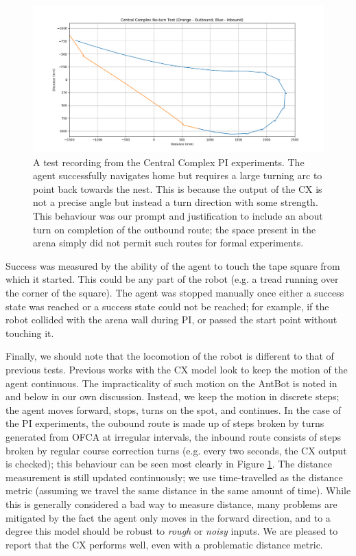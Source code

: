 \documentclass[a4paper,11pt,twoside,openright]{article}
\begin{document}
\begin{figure}[h!]
  \centering
  \includegraphics[width=\textwidth]{CXNT}
  \caption{\label{fig:cxnt} A test recording from the Central Complex
    PI experiments. The agent successfully navigates home but requires a large
    turning arc to point back towards the nest. This is because the output of the
    CX is not a precise angle but instead a turn direction with some strength.
    This behaviour was our prompt and justification to include an about turn on
    completion of the outbound route; the space present in the arena simply did
    not permit such routes for formal experiments.
  }
\end{figure}

Success was measured by the ability of the agent to touch the tape
square from which it started. This could be any part of the robot
(e.g. a tread running over the corner of the square). The agent was
stopped manually once either a success state was reached or a success
state could not be reached; for example, if the robot collided with
the arena wall during PI, or passed the start point without touching it.
\newline\par

Finally,  we should note that the locomotion of the robot is different to that of
previous tests. Previous works with the CX model look to keep the motion of the
agent continuous. The impracticality of such motion on the AntBot is noted in
\cite{Mitchell2018} and below in our own discussion. Instead, we keep the motion
in discrete steps; the agent moves forward, stops, turns on the spot, and
continues. In the case of the PI experiments, the oubound route is made up of
steps broken by turns generated from OFCA at irregular intervals, the inbound
route consists of steps broken by regular course correction turns (e.g. every two
seconds, the CX output is checked); this behaviour can be seen most
clearly in Figure \ref{fig:cxnt}. The distance measurement is still updated
continuously; we use time-travelled as the distance metric (assuming we
travel the same distance in the same amount of time). While this is generally
considered a bad way to measure distance, many problems are mitigated by the
fact the agent only moves in the forward direction, and to a degree this model
should be robust to \textit{rough} or \textit{noisy} inputs. We are pleased to
report that the CX performs well, even with a problematic distance metric.
\end{document}
